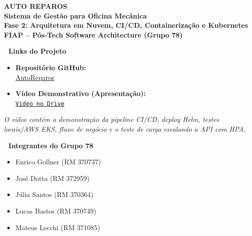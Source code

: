 \documentclass[10pt,a4paper]{article}
\begin{document}
\pagestyle{empty}

\begin{center}
    {\LARGE \textbf{\color{primary} AUTO REPAROS}} \\
    \vspace{0.1cm}
    {\large \textbf{Sistema de Gestão para Oficina Mecânica}} \\
    \vspace{0.15cm}
    {\color{gray}\textbf{Fase 2: Arquitetura em Nuvem, CI/CD, Containerização e Kubernetes}} \\
    \vspace{0.1cm}
    \textbf{FIAP -- Pós-Tech Software Architecture (Grupo 78)}
\end{center}

\vspace{0.2cm}

\begin{tcolorbox}[elegantbox]
    \begin{minipage}[t]{0.52\textwidth}
        \textbf{\color{primary}🔗 Links do Projeto}
        \vspace{0.2cm}
        \begin{itemize}
            \item \textbf{Repositório GitHub:} \\
            \href{https://github.com/Grupo78-PosTech-15SOAT/AutoReparos}{AutoReparos}
            
            \item \textbf{Vídeo Demonstrativo (Apresentação):} \\
            \href{https://drive.google.com/file/d/1wpeMYPY7q6-YYxHCgSaO52PLPLOrK1k3/view?usp=sharing}{\texttt{Video no Drive}}
        \end{itemize}
        \vspace{0.1cm}
        \textit{\small * O vídeo contém a demonstração da pipeline CI/CD, deploy Helm, testes locais/AWS EKS, fluxo de negócio e o teste de carga escalando a API com HPA.}
    \end{minipage}
    \hfill
    \begin{minipage}[t]{0.42\textwidth}
        \textbf{\color{primary}👥 Integrantes do Grupo 78}
        \vspace{0.2cm}
        \begin{itemize}
            \item Enrico Gollner (RM 370737)
            \item José Dotta (RM 372959)
            \item Júlia Santos (RM 370364)
            \item Lucas Bastos (RM 370749)
            \item Mateus Lecchi (RM 371085)
        \end{itemize}
    \end{minipage}
\end{tcolorbox}
\end{document}
